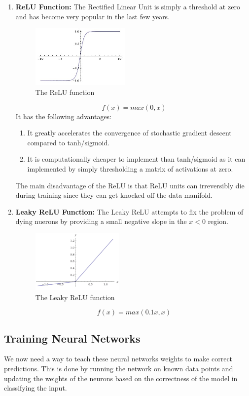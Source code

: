 \documentclass[twoside]{article}
\begin{document}
\begin{enumerate}
\item \textbf{ReLU Function:}
The Rectified Linear Unit is simply a threshold at zero and has become very popular in the last few years.
\begin{figure}[!htb]
\centering
\includegraphics[height = 1.2in]{pics/tanh.jpeg}
\caption{The ReLU function\cite{cs231n-website}}
\label{fig:ReLU}
\end{figure}
\begin{equation*}
f(x) = max( 0, x )
\end{equation*}
It has the following advantages:
\begin{enumerate}
\item It greatly accelerates the convergence of stochastic gradient descent compared to tanh/sigmoid.
\item It is computationally cheaper to implement than tanh/sigmoid as it can implemented by simply thresholding a matrix of activations at zero.
\end{enumerate}
The main disadvantage of the ReLU is that ReLU units can irreversibly die during training since they can get knocked off the data manifold.

\item \textbf{Leaky ReLU Function:}
The Leaky ReLU attempts to fix the problem of dying nuerons by providing a small negative slope in the $x<0$ region.
\begin{figure}[!htb]
\centering
\includegraphics[height = 1.2in]{pics/Leaky.png}
\caption{The Leaky ReLU function\cite{cs231n-website}}
\label{fig:ReLU}
\end{figure}
\begin{equation*}
f(x) = max( 0.1 x, x )
\end{equation*}

\end{enumerate}
\subsection{Training Neural Networks}
We now need a way to teach these neural networks weights to make correct predictions. This is done by running the network on known data points and updating the weights of the neurons based on the correctness of the model in classifying the input. \\
\end{document}
